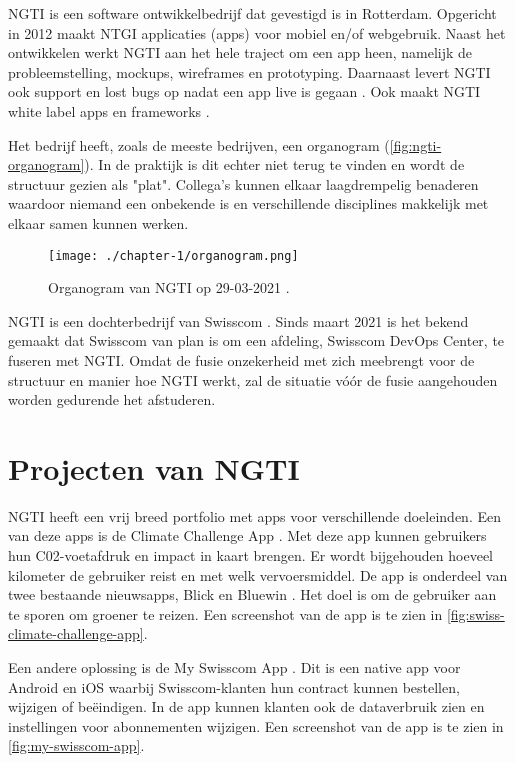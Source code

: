 
NGTI is een software ontwikkelbedrijf dat gevestigd is in Rotterdam. Opgericht in 2012 maakt NTGI applicaties (apps) voor mobiel en/of webgebruik. Naast het ontwikkelen werkt NGTI aan het hele traject om een app heen, namelijk de probleemstelling, mockups, wireframes en prototyping. Daarnaast levert NGTI ook support en lost bugs op nadat een app live is gegaan \cite{ngti-services}. Ook maakt NGTI white label apps en frameworks \cite{ngti-solutions}.

Het bedrijf heeft, zoals de meeste bedrijven, een organogram (\autoref{fig:ngti-organogram}). In de praktijk is dit echter niet terug te vinden en wordt de structuur gezien als "plat". Collega's kunnen elkaar laagdrempelig benaderen waardoor niemand een onbekende is en verschillende disciplines makkelijk met elkaar samen kunnen werken.  

\begin{figure}[hbt!]
  \centering
  \texttt{[image: ./chapter-1/organogram.png]}
  \caption{Organogram van NGTI op 29-03-2021 \cite{ngti-organogram}.}
  \label{fig:ngti-organogram}
\end{figure}

NGTI is een dochterbedrijf van Swisscom \cite{swisscom-other-division}. Sinds maart 2021 is het bekend gemaakt dat Swisscom van plan is om een afdeling, Swisscom DevOps Center, te fuseren met NGTI. Omdat de fusie onzekerheid met zich meebrengt voor de structuur en manier hoe NGTI werkt, zal de situatie vóór de fusie aangehouden worden gedurende het afstuderen.

\section{Projecten van NGTI}\label{sec:projecten-van-ngti}
NGTI heeft een vrij breed portfolio met apps voor verschillende doeleinden. Een van deze apps is de Climate Challenge App \cite{ngti-swisscom-climate-challenge}. Met deze app kunnen gebruikers hun C02-voetafdruk en impact in kaart brengen. Er wordt bijgehouden hoeveel kilometer de gebruiker reist en met welk vervoersmiddel. De app is onderdeel van twee bestaande nieuwsapps, Blick en Bluewin \cite{swisscom-climate-challenge-integration}. Het doel is om de gebruiker aan te sporen om groener te reizen. Een screenshot van de app is te zien in \autoref{fig:swiss-climate-challenge-app}.

Een andere oplossing is de My Swisscom App \cite{ngti-my-swisscom-app}. Dit is een native app voor Android en iOS waarbij Swisscom-klanten hun contract kunnen bestellen, wijzigen of beëindigen. In de app kunnen klanten ook de dataverbruik zien en instellingen voor abonnementen wijzigen. Een screenshot van de app is te zien in \autoref{fig:my-swisscom-app}.

